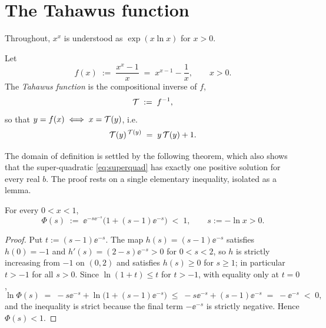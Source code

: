 \section{The Tahawus function}\label{sec:function}

Throughout, $x^{x}$ is understood as $\exp(x \ln x)$ for $x > 0$.

\begin{definition}\label{def:tah}
Let
\begin{equation}\label{eq:f-def}
    f(x) \;:=\; \frac{x^{x} - 1}{x} \;=\; x^{x-1} - \frac{1}{x},
    \qquad x > 0 .
\end{equation}
The \emph{Tahawus function} is the compositional inverse of $f$,
\begin{equation}\label{eq:tah-def}
    \mathcal{T} \;:=\; f^{-1},
\end{equation}
so that $y = f(x) \iff x = \mathcal{T}(y)$, i.e.
\begin{equation}\label{eq:defining}
    \mathcal{T}(y)^{\,\mathcal{T}(y)} \;=\; y\,\mathcal{T}(y) + 1 .
\end{equation}
\end{definition}

The domain of definition is settled by the following theorem, which
also shows that the super-quadratic \eqref{eq:superquad} has exactly one
positive solution for every real $b$. The proof rests on a single
elementary inequality, isolated as a lemma.

\begin{lemma}\label{lem:mono}
For every $0 < x < 1$,
\begin{equation}\label{eq:phi-ineq}
    \Phi(s) \;:=\; \ee^{-s\ee^{-s}}\bigl(1 + (s-1)\ee^{-s}\bigr) \;<\; 1,
    \qquad s := -\ln x > 0 .
\end{equation}
\end{lemma}

\begin{proof}
Put $t := (s-1)\ee^{-s}$. The map $h(s) = (s-1)\ee^{-s}$ satisfies
$h(0) = -1$ and $h'(s) = (2-s)\ee^{-s} > 0$ for $0 < s < 2$, so $h$ is
strictly increasing from $-1$ on $(0,2)$ and satisfies $h(s) \ge 0$ for
$s \ge 1$; in particular $t > -1$ for all $s > 0$. Since
$\ln(1+t) \le t$ for $t > -1$, with equality only at $t = 0$,
\[
    \ln \Phi(s)
    \;=\; -s\ee^{-s} + \ln\bigl(1 + (s-1)\ee^{-s}\bigr)
    \;\le\; -s\ee^{-s} + (s-1)\ee^{-s}
    \;=\; -\ee^{-s} \;<\; 0 ,
\]
and the inequality is strict because the final term $-\ee^{-s}$ is
strictly negative. Hence $\Phi(s) < 1$.
\end{proof}

